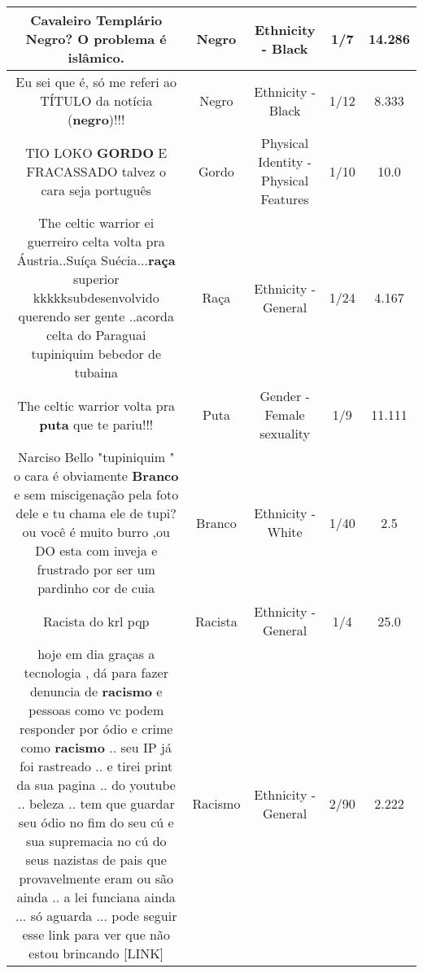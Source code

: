 \documentclass[11pt]{article}
\newlength\mylength
\begin{document}
\begin{center}
\begin{longtable}{|C{.65\mylength}|C{.30\mylength}|C{.12\mylength}|C{.12\mylength}|C{.12\mylength}|}
  \small Cavaleiro Templário \textbf{Negro}? O problema é islâmico.\normalsize   & Negro & Ethnicity - Black & 1/7 & 14.286 \\  \hline
  \small Eu sei que é, só me referi ao TÍTULO da notícia (\textbf{negro})!!!\normalsize   & Negro & Ethnicity - Black & 1/12 & 8.333 \\  \hline
  \small TIO LOKO \textbf{GORDO} E FRACASSADO talvez o cara seja português\normalsize   & Gordo & Physical Identity - Physical Features & 1/10 & 10.0 \\  \hline
  \small The celtic warrior ei guerreiro celta volta pra Áustria..Suíça Suécia...\textbf{raça} superior kkkkksubdesenvolvido querendo ser gente ..acorda celta do Paraguai tupiniquim bebedor de tubaina\normalsize   & Raça & Ethnicity - General & 1/24 & 4.167 \\  \hline
  \small The celtic warrior volta pra \textbf{puta} que te pariu!!!\normalsize   & Puta & Gender - Female sexuality & 1/9 & 11.111 \\  \hline
  \small Narciso Bello "tupiniquim " o cara é obviamente \textbf{Branco} e sem miscigenação pela foto dele e tu chama ele de tupi?  ou você é muito burro ,ou DO esta com inveja e frustrado por ser um pardinho cor de cuia\normalsize   & Branco & Ethnicity - White & 1/40 & 2.5 \\  \hline
  \small Racista do krl pqp\normalsize   & Racista & Ethnicity - General & 1/4 & 25.0 \\  \hline
  \small hoje em dia graças a tecnologia , dá para fazer denuncia de \textbf{racismo} e pessoas como vc podem responder por ódio e crime como \textbf{racismo} .. seu IP já foi rastreado .. e tirei print da sua pagina .. do youtube .. beleza .. tem que guardar seu ódio no fim do seu cú e sua supremacia no cú do seus nazistas de pais que provavelmente eram ou são ainda .. a lei funciana ainda ... só aguarda    ... pode seguir esse link para ver que não estou brincando   [LINK] \normalsize   & Racismo & Ethnicity - General & 2/90 & 2.222 \\  \hline

\end{longtable}
\end{center}
\end{document}
